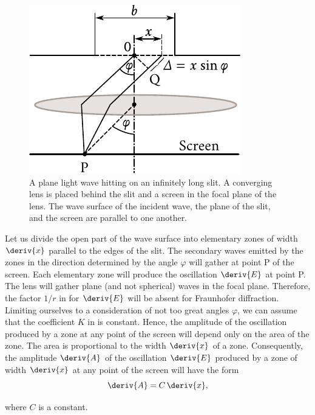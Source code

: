 \begin{figure}[t]
	\begin{center}
		\includegraphics[scale=1]{figures/ch_18/fig_18_26.pdf}
        \caption[]{A plane light wave hitting on an infinitely long slit. A converging lens is placed behind the slit and a screen in the focal plane of the lens. The wave surface of the incident wave, the plane of the slit, and the screen are parallel to one another.}
		\label{fig:18_26}
	\end{center}
	\vspace{-0.8cm}
\end{figure}

Let us divide the open part of the wave surface into elementary zones of width $\deriv{x}$ parallel to the edges of the slit.
The secondary waves emitted by the zones in the
direction determined by the angle $\varphi$ will gather at point P of the screen.
Each elementary zone will produce the oscillation $\deriv{E}$ at point P.
The lens will gather plane (and not spherical) waves in the focal plane.
Therefore, the factor $1/r$ in  for $\deriv{E}$ will be absent for Fraunhofer diffraction.
Limiting ourselves to a consideration of not too great angles $\varphi$, we can assume that the coefficient $K$ in  is constant.
Hence, the amplitude of the oscillation produced by a zone at any point of the screen will depend only on the area of the zone.
The area is proportional to the width $\deriv{x}$ of a zone.
Consequently, the amplitude $\deriv{A}$ of the oscillation $\deriv{E}$ produced by a zone of width $\deriv{x}$ at any point of the screen will have the form
\begin{equation*}
	\deriv{A} = C\, \deriv{x},
\end{equation*}

\noindent
where $C$ is a constant.

